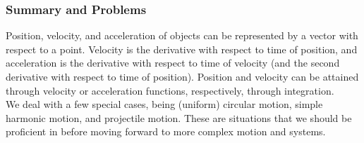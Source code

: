 \subsubsection{Summary and Problems}
Position, velocity, and acceleration of objects can be represented by a vector with respect to a point. Velocity is the derivative with respect to time of position, and acceleration is the derivative with respect to time of velocity (and the second derivative with respect to time of position). Position and velocity can be attained through velocity or acceleration functions, respectively, through integration. \\
We deal with a few special cases, being (uniform) circular motion, simple harmonic motion, and projectile motion. These are situations that we should be proficient in before moving forward to more complex motion and systems. \\

